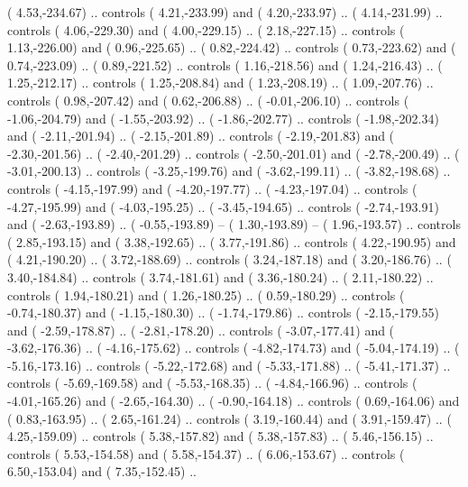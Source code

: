 {        (   4.53,-234.67) .. controls (   4.21,-233.99) and (   4.20,-233.97) ..
        (   4.14,-231.99) .. controls (   4.06,-229.30) and (   4.00,-229.15) ..
        (   2.18,-227.15) .. controls (   1.13,-226.00) and (   0.96,-225.65) ..
        (   0.82,-224.42) .. controls (   0.73,-223.62) and (   0.74,-223.09) ..
        (   0.89,-221.52) .. controls (   1.16,-218.56) and (   1.24,-216.43) ..
        (   1.25,-212.17) .. controls (   1.25,-208.84) and (   1.23,-208.19) ..
        (   1.09,-207.76) .. controls (   0.98,-207.42) and (   0.62,-206.88) ..
        (  -0.01,-206.10) .. controls (  -1.06,-204.79) and (  -1.55,-203.92) ..
        (  -1.86,-202.77) .. controls (  -1.98,-202.34) and (  -2.11,-201.94) ..
        (  -2.15,-201.89) .. controls (  -2.19,-201.83) and (  -2.30,-201.56) ..
        (  -2.40,-201.29) .. controls (  -2.50,-201.01) and (  -2.78,-200.49) ..
        (  -3.01,-200.13) .. controls (  -3.25,-199.76) and (  -3.62,-199.11) ..
        (  -3.82,-198.68) .. controls (  -4.15,-197.99) and (  -4.20,-197.77) ..
        (  -4.23,-197.04) .. controls (  -4.27,-195.99) and (  -4.03,-195.25) ..
        (  -3.45,-194.65) .. controls (  -2.74,-193.91) and (  -2.63,-193.89) ..
        (  -0.55,-193.89) -- 
        (   1.30,-193.89) -- 
        (   1.96,-193.57) .. controls (   2.85,-193.15) and (   3.38,-192.65) ..
        (   3.77,-191.86) .. controls (   4.22,-190.95) and (   4.21,-190.20) ..
        (   3.72,-188.69) .. controls (   3.24,-187.18) and (   3.20,-186.76) ..
        (   3.40,-184.84) .. controls (   3.74,-181.61) and (   3.36,-180.24) ..
        (   2.11,-180.22) .. controls (   1.94,-180.21) and (   1.26,-180.25) ..
        (   0.59,-180.29) .. controls (  -0.74,-180.37) and (  -1.15,-180.30) ..
        (  -1.74,-179.86) .. controls (  -2.15,-179.55) and (  -2.59,-178.87) ..
        (  -2.81,-178.20) .. controls (  -3.07,-177.41) and (  -3.62,-176.36) ..
        (  -4.16,-175.62) .. controls (  -4.82,-174.73) and (  -5.04,-174.19) ..
        (  -5.16,-173.16) .. controls (  -5.22,-172.68) and (  -5.33,-171.88) ..
        (  -5.41,-171.37) .. controls (  -5.69,-169.58) and (  -5.53,-168.35) ..
        (  -4.84,-166.96) .. controls (  -4.01,-165.26) and (  -2.65,-164.30) ..
        (  -0.90,-164.18) .. controls (   0.69,-164.06) and (   0.83,-163.95) ..
        (   2.65,-161.24) .. controls (   3.19,-160.44) and (   3.91,-159.47) ..
        (   4.25,-159.09) .. controls (   5.38,-157.82) and (   5.38,-157.83) ..
        (   5.46,-156.15) .. controls (   5.53,-154.58) and (   5.58,-154.37) ..
        (   6.06,-153.67) .. controls (   6.50,-153.04) and (   7.35,-152.45) ..
}
